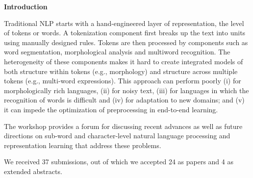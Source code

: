 \documentclass[11pt]{article}
\begin{document}
\begin{center}
  {\Large \bf Introduction}
\end{center}

\vspace*{0.5cm}


Traditional NLP starts with a hand-engineered layer of representation, the level of tokens or words.  A tokenization component first breaks up the text into units using manually designed rules. Tokens are then processed by components such as word segmentation, morphological analysis and multiword recognition.  The heterogeneity of these components makes it hard to create integrated models of both structure within tokens (e.g., morphology) and structure across multiple tokens (e.g., multi-word expressions). This approach can perform poorly (i) for morphologically rich languages, (ii) for noisy text, (iii) for languages in which the recognition of words is difficult and (iv) for adaptation to new domains; and (v) it can impede the optimization of preprocessing in end-to-end learning.

The workshop provides a forum for discussing recent advances as well as future directions on sub-word and character-level natural language processing and representation learning that address these problems.

We received 37 submissions, out of which we accepted 24 as papers and 4 as extended abstracts. 
\end{document}
